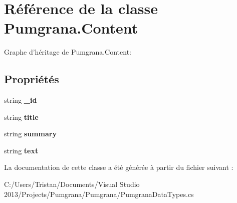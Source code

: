 \hypertarget{class_pumgrana_1_1_content}{\section{Référence de la classe Pumgrana.\+Content}
\label{class_pumgrana_1_1_content}
}


Graphe d'héritage de Pumgrana.\+Content\+:
\subsection*{Propriétés}
\begin{DoxyCompactItemize}
\item 
\hypertarget{class_pumgrana_1_1_content_a009801028819692d1ab4b794fa89d0b7}{string {\bfseries \+\_\+id}}\label{class_pumgrana_1_1_content_a009801028819692d1ab4b794fa89d0b7}

\item 
\hypertarget{class_pumgrana_1_1_content_a8be17bdb03fccab449ef66cfaf32a7c4}{string {\bfseries title}}\label{class_pumgrana_1_1_content_a8be17bdb03fccab449ef66cfaf32a7c4}

\item 
\hypertarget{class_pumgrana_1_1_content_a829870fe00c95085eba8e87e285d8b21}{string {\bfseries summary}}\label{class_pumgrana_1_1_content_a829870fe00c95085eba8e87e285d8b21}

\item 
\hypertarget{class_pumgrana_1_1_content_ab930038e2fb678d6a668e36ffa56e2f3}{string {\bfseries text}}\label{class_pumgrana_1_1_content_ab930038e2fb678d6a668e36ffa56e2f3}

\end{DoxyCompactItemize}


La documentation de cette classe a été générée à partir du fichier suivant \+:\begin{DoxyCompactItemize}
\item 
C\+:/\+Users/\+Tristan/\+Documents/\+Visual Studio 2013/\+Projects/\+Pumgrana/\+Pumgrana/Pumgrana\+Data\+Types.\+cs\end{DoxyCompactItemize}
